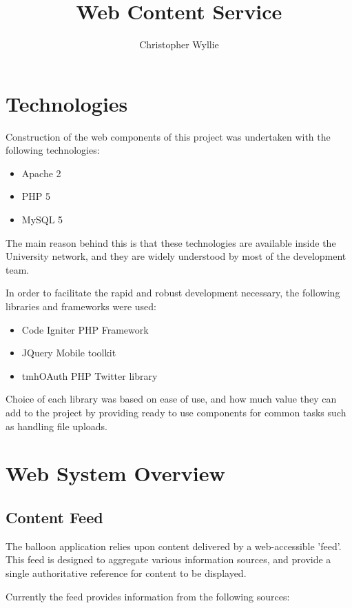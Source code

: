 \documentclass[11pt]{article}
\title{\textbf{Web Content Service}}
\author{Christopher Wyllie}
\date{}
\begin{document}
\maketitle

\section{Technologies}

Construction of the web components of this project was undertaken with the following technologies:

\begin{itemize}
	\item Apache 2
	\item PHP 5
	\item MySQL 5
\end{itemize}

The main reason behind this is that these technologies are available inside the University network, and they are widely understood by most of the development team.

In order to facilitate the rapid and robust development necessary, the following libraries and frameworks were used:

\begin{itemize}
	\item Code Igniter PHP Framework
	\item JQuery Mobile toolkit
	\item tmhOAuth PHP Twitter library
\end{itemize}

Choice of each library was based on ease of use, and how much value they can add to the project by providing ready to use components for common tasks such as handling file uploads.

\section{Web System Overview}

\subsection{Content Feed}

The balloon application relies upon content delivered by a web-accessible 'feed'. This feed is designed to aggregate various information sources, and provide a single authoritative reference for content to be displayed.

Currently the feed provides information from the following sources:
\end{document}
